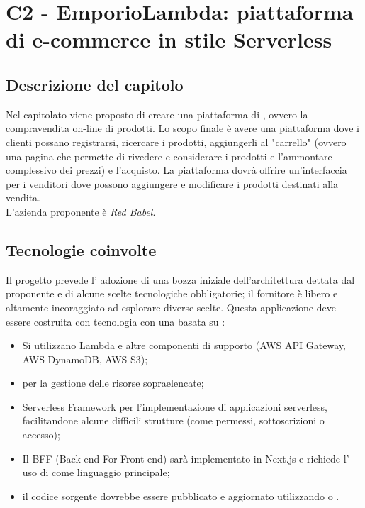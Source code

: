 \section{C2 - EmporioLambda: piattaforma di e-commerce in stile Serverless}

\subsection{Descrizione del capitolo}
Nel capitolato viene proposto di creare una piattaforma di , ovvero la compravendita on-line di prodotti.
Lo scopo finale è avere una piattaforma dove i clienti possano registrarsi, ricercare i prodotti, aggiungerli al "carrello" (ovvero una pagina che permette di rivedere e considerare i prodotti e l'ammontare complessivo dei prezzi) e l'acquisto. La piattaforma dovrà offrire un'interfaccia per i venditori dove possono aggiungere e modificare i prodotti destinati alla vendita.\\
L'azienda proponente è \textit{Red Babel}.

\subsection{Tecnologie coinvolte}
Il progetto prevede l' adozione di una bozza iniziale dell'architettura dettata dal proponente e di alcune scelte tecnologiche obbligatorie; il fornitore è libero e altamente incoraggiato ad esplorare diverse scelte.
Questa applicazione deve essere costruita con tecnologia  con una  basata su :
\begin{itemize}
\item	Si utilizzano  Lambda e altre componenti di supporto (AWS API Gateway, AWS DynamoDB, AWS S3);
\item	{} per la gestione delle risorse sopraelencate;
\item	Serverless Framework per l’implementazione di applicazioni serverless, facilitandone alcune difficili strutture (come permessi, sottoscrizioni o accesso);
\item	Il BFF (Back end For Front end) sarà implementato in Next.js e richiede l' uso di  come linguaggio principale;
\item	il codice sorgente dovrebbe essere pubblicato e aggiornato utilizzando  o .
\end{itemize}

